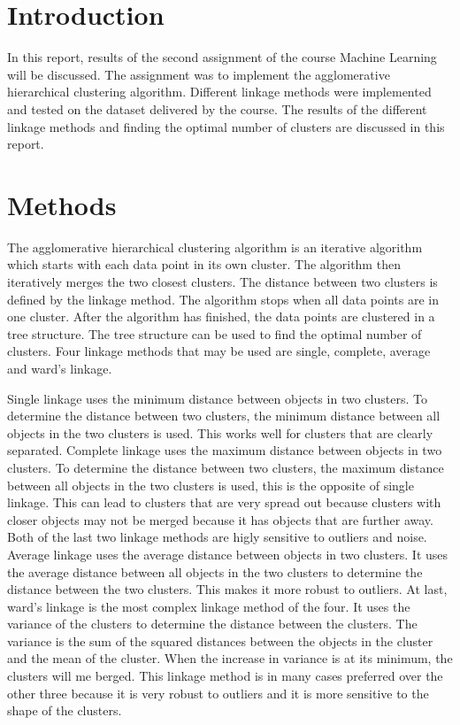 \documentclass[twoside, a4paper, fleqn, reqno]{article}
\begin{document}
\maketitle

\section{Introduction}
In this report, results of the second assignment of the course Machine Learning will be discussed.
The assignment was to implement the agglomerative hierarchical clustering algorithm.
Different linkage methods were implemented and tested on the dataset delivered by the course.
The results of the different linkage methods and finding the optimal number
of clusters are discussed in this report.

\section{Methods}
The agglomerative hierarchical clustering algorithm is an iterative algorithm which
starts with each data point in its own cluster.
The algorithm then iteratively merges the two closest clusters.
The distance between two clusters is defined by the linkage method.
The algorithm stops when all data points are in one cluster.
After the algorithm has finished, the data points are clustered in a tree structure.
The tree structure can be used to find the optimal number of clusters.
Four linkage methods that may be used are single, complete, average and ward's linkage.
\par
Single linkage uses the minimum distance between objects in two clusters.
To determine the distance between two clusters, the minimum distance between
all objects in the two clusters is used. This works well for clusters that are
clearly separated.
Complete linkage uses the maximum distance between objects in two clusters.
To determine the distance between two clusters, the maximum distance between
all objects in the two clusters is used, this is the opposite of single linkage.
This can lead to clusters that are very spread out because clusters with closer
objects may not be merged because it has objects that are further away.
Both of the last two linkage methods are higly sensitive to outliers and noise.
Average linkage uses the average distance between objects in two clusters.
It uses the average distance between all objects in the two clusters to determine
the distance between the two clusters. This makes it more robust to outliers.
At last, ward's linkage is the most complex linkage method of the four.
It uses the variance of the clusters to determine the distance between the clusters.
The variance is the sum of the squared distances between the objects in the cluster
and the mean of the cluster. When the increase in variance is at its minimum,
the clusters will me berged. This linkage method is in many cases preferred over the other three
because it is very robust to outliers and it is more sensitive to the shape of the clusters.
\end{document}
